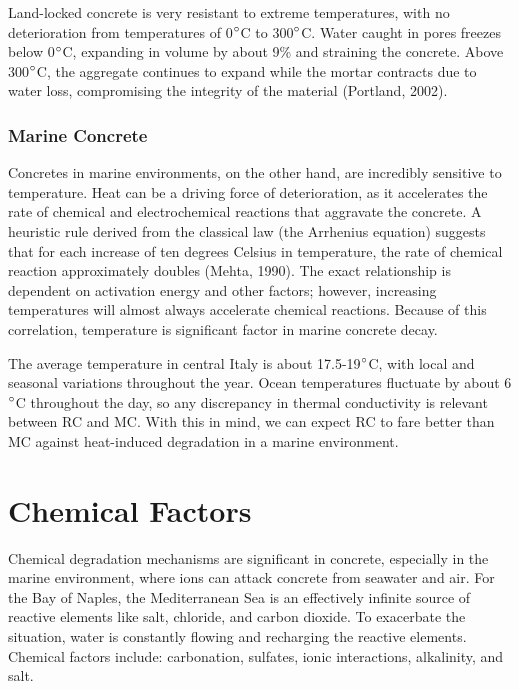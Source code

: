 \documentclass[12pt]{article}
\begin{document}
Land-locked concrete is very resistant to extreme temperatures, with no deterioration from temperatures of 0$\degree$C to 300$\degree$C. Water caught in pores freezes below 0$\degree$C, expanding in volume by about 9\% and straining the concrete. Above 300$\degree$C, the aggregate continues to expand while the mortar contracts due to water loss, compromising the integrity of the material (Portland, 2002).

\subsubsection*{Marine Concrete}

Concretes in marine environments, on the other hand, are incredibly sensitive to temperature. Heat can be a driving force of deterioration, as it accelerates the rate of chemical and electrochemical reactions that aggravate the concrete. A heuristic rule derived from the classical law (the Arrhenius equation) suggests that for each increase of ten degrees Celsius in temperature, the rate of chemical reaction approximately doubles (Mehta, 1990).  The exact relationship is dependent on activation energy and other factors; however, increasing temperatures will almost always accelerate chemical reactions. Because of this correlation, temperature is significant factor in marine concrete decay.

The average temperature in central Italy is about 17.5-19$\degree$C, with local and seasonal variations throughout the year. Ocean temperatures fluctuate by about 6$\degree$C throughout the day, so any discrepancy in thermal conductivity is relevant between RC and MC. With this in mind, we can expect RC to fare better than MC against heat-induced degradation in a marine environment.


\section*{Chemical Factors}

Chemical degradation mechanisms are significant in concrete, especially in the marine environment, where ions can attack concrete from seawater and air. For the Bay of Naples, the Mediterranean Sea is an effectively infinite source of reactive elements like salt, chloride, and carbon dioxide. To exacerbate the situation, water is constantly flowing and recharging the reactive elements. Chemical factors include: carbonation, sulfates, ionic interactions, alkalinity, and salt.
\end{document}

